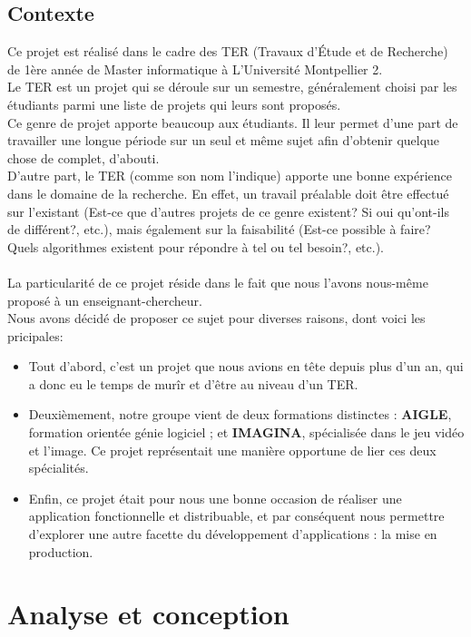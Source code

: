 \documentclass{report}
\begin{document}
		\section{Contexte}
		Ce projet est réalisé dans le cadre des TER (Travaux d'Étude et de Recherche) de 1ère année de Master informatique à L'Université Montpellier 2. \\
		Le TER est un projet qui se déroule sur un semestre, généralement choisi par les étudiants parmi une liste de projets qui leurs sont proposés. \\Ce genre de projet apporte beaucoup aux étudiants. Il leur permet d'une part de travailler une longue période sur un seul et même sujet afin d'obtenir quelque chose de complet, d'abouti. \\D'autre part, le TER (comme son nom l'indique) apporte une bonne expérience dans le domaine de la recherche. En effet, un travail préalable doit être effectué sur l'existant (Est-ce que d'autres projets de ce genre existent? Si oui qu'ont-ils de différent?, etc.), mais également sur la faisabilité (Est-ce possible à faire? Quels algorithmes existent pour répondre à tel ou tel besoin?, etc.). \\
		$$$$ \\
		La particularité de ce projet réside dans le fait que nous l'avons nous-même proposé à un enseignant-chercheur.\\
		Nous avons décidé de proposer ce sujet pour diverses raisons, dont voici les pricipales:
		\begin{itemize}
			\item Tout d'abord, c'est un projet que nous avions en tête depuis plus d'un an, qui a donc eu le temps de murîr et d'être au niveau d'un TER.
			\item Deuxièmement, notre groupe vient de deux formations distinctes : \textbf{AIGLE}, formation orientée génie logiciel ; et \textbf{IMAGINA}, spécialisée dans le jeu vidéo et l'image. Ce projet représentait une manière opportune de lier ces deux spécialités.
			\item Enfin, ce projet était pour nous une bonne occasion de réaliser une application fonctionnelle et distribuable, et par conséquent nous permettre d'explorer une autre facette du développement d'applications : la mise en production.

		\end{itemize}	
	\chapter{Analyse et conception}
\end{document}
